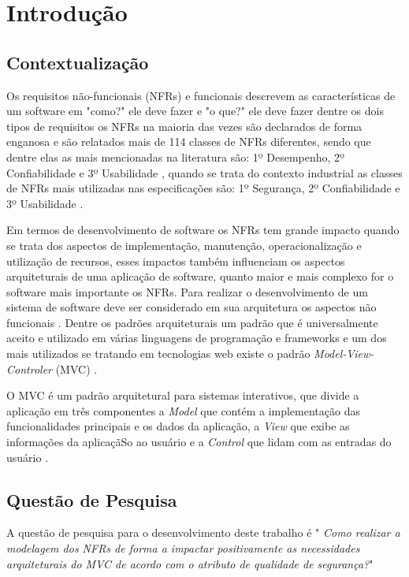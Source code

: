 \chapter{Introdução}

\section{Contextualização}

Os requisitos não-funcionais (NFRs) e funcionais descrevem as características de um software em "como?" ele deve fazer e "o que?" ele deve fazer \cite{sommerville1997requirements}  dentre os dois tipos de requisitos os NFRs na maioria das vezes são declarados de forma enganosa \cite{eckhardt2016non} e são relatados mais de 114 classes de NFRs diferentes, sendo que dentre elas as mais mencionadas na literatura são: 1º Desempenho, 2º Confiabilidade e  3º Usabilidade \cite{mairiza2010investigation}, quando se trata do contexto industrial as classes de NFRs mais utilizadas nas especificações são: 1º Segurança, 2º Confiabilidade e 3º Usabilidade \cite{eckhardt2016non}.

Em termos de desenvolvimento de software os NFRs tem grande impacto quando se trata dos aspectos de implementação, manutenção, operacionalização e utilização de recursos, esses impactos também influenciam os aspectos arquiteturais de uma aplicação de software, quanto maior e mais complexo for o software mais importante os NFRs. Para realizar o desenvolvimento de um sistema de software deve ser considerado em sua arquitetura os aspectos não funcionais \cite{buschmann1996system}. Dentre os padrões arquiteturais um padrão que é universalmente aceito e utilizado em várias linguagens de programação e frameworks e um dos mais utilizados se tratando em tecnologias web existe o padrão \textit{Model-View-Controler} (MVC) \cite{jailia2016behavior}.

O MVC é um padrão arquitetural para sistemas interativos, que divide a aplicação em três componentes a \textit{Model} que contém a implementação das funcionalidades principais e os dados da aplicação, a \textit{View} que exibe as informações da aplicaçãSo ao usuário e a \textit{Control} que lidam com as entradas do usuário \cite{buschmann1996system}. 

\section{Questão de Pesquisa}
A questão de pesquisa para o desenvolvimento deste trabalho é " \textit{Como realizar a modelagem dos NFRs de forma a impactar positivamente as necessidades arquiteturais do MVC de acordo com o atributo de qualidade de segurança?}"

